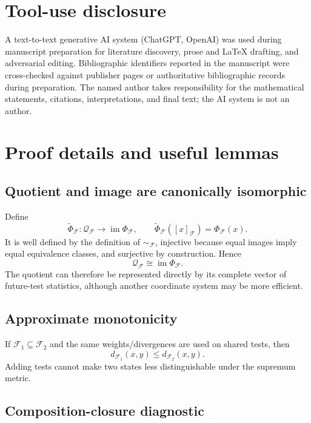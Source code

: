 \documentclass[11pt]{article}
\newcommand{\F}{\mathcal F}
\newcommand{\Q}{\mathcal Q}
\newcommand{\im}{\operatorname{im}}
\begin{document}
\section*{Tool-use disclosure}
A text-to-text generative AI system (ChatGPT, OpenAI) was used during manuscript preparation for literature discovery, prose and LaTeX drafting, and adversarial editing. Bibliographic identifiers reported in the manuscript were cross-checked against publisher pages or authoritative bibliographic records during preparation. The named author takes responsibility for the mathematical statements, citations, interpretations, and final text; the AI system is not an author.

\appendix

\section{Proof details and useful lemmas}

\subsection{Quotient and image are canonically isomorphic}

Define
\begin{equation}
  \widetilde\Phi_{\F}:\Q_{\F}\to\im\Phi_{\F},
  \qquad
  \widetilde\Phi_{\F}([x]_{\F})=\Phi_{\F}(x).
\end{equation}
It is well defined by the definition of $\sim_{\F}$, injective because equal images imply equal equivalence classes, and surjective by construction. Hence
\begin{equation}
  \Q_{\F}\cong \im\Phi_{\F}.
\end{equation}
The quotient can therefore be represented directly by its complete vector of future-test statistics, although another coordinate system may be more efficient.

\subsection{Approximate monotonicity}

If $\F_1\subseteq\F_2$ and the same weights/divergences are used on shared tests, then
\begin{equation}
  d_{\F_1}(x,y)\le d_{\F_2}(x,y).
\end{equation}
Adding tests cannot make two states less distinguishable under the supremum metric.

\subsection{Composition-closure diagnostic}
\end{document}
